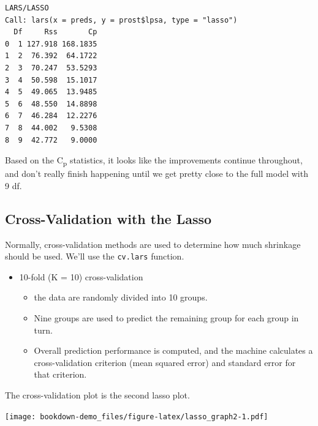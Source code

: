\documentclass[]{book}
\newenvironment{Shaded}{\begin{snugshade}}{\end{snugshade}}
\newcommand{\KeywordTok}[1]{\textcolor[rgb]{0.13,0.29,0.53}{\textbf{#1}}}
\newcommand{\DataTypeTok}[1]{\textcolor[rgb]{0.13,0.29,0.53}{#1}}
\newcommand{\DecValTok}[1]{\textcolor[rgb]{0.00,0.00,0.81}{#1}}
\newcommand{\StringTok}[1]{\textcolor[rgb]{0.31,0.60,0.02}{#1}}
\newcommand{\OperatorTok}[1]{\textcolor[rgb]{0.81,0.36,0.00}{\textbf{#1}}}
\newcommand{\NormalTok}[1]{#1}
\providecommand{\tightlist}{%
  \setlength{\itemsep}{0pt}\setlength{\parskip}{0pt}}
\theoremstyle{definition}
\theoremstyle{definition}
\theoremstyle{definition}
\theoremstyle{remark}
\begin{document}
\begin{verbatim}
LARS/LASSO
Call: lars(x = preds, y = prost$lpsa, type = "lasso")
  Df     Rss       Cp
0  1 127.918 168.1835
1  2  76.392  64.1722
2  3  70.247  53.5293
3  4  50.598  15.1017
4  5  49.065  13.9485
5  6  48.550  14.8898
6  7  46.284  12.2276
7  8  44.002   9.5308
8  9  42.772   9.0000
\end{verbatim}

Based on the C\textsubscript{p} statistics, it looks like the
improvements continue throughout, and don't really finish happening
until we get pretty close to the full model with 9 df.

\subsection{Cross-Validation with the
Lasso}\label{cross-validation-with-the-lasso}

Normally, cross-validation methods are used to determine how much
shrinkage should be used. We'll use the \texttt{cv.lars} function.

\begin{itemize}
\tightlist
\item
  10-fold (K = 10) cross-validation

  \begin{itemize}
  \tightlist
  \item
    the data are randomly divided into 10 groups.
  \item
    Nine groups are used to predict the remaining group for each group
    in turn.
  \item
    Overall prediction performance is computed, and the machine
    calculates a cross-validation criterion (mean squared error) and
    standard error for that criterion.
  \end{itemize}
\end{itemize}

The cross-validation plot is the second lasso plot.

\begin{Shaded}
\end{Shaded}

\texttt{[image: bookdown-demo\_files/figure-latex/lasso\_graph2-1.pdf]}
\end{document}
